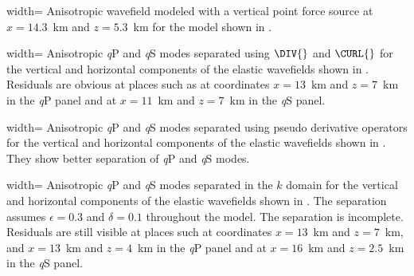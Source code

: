 
{width=\textwidth} {Anisotropic wavefield modeled with a vertical
point force source at $x=14.3$~km and $z=5.3$~km for the model shown in
{}.}


{width=\textwidth} {Anisotropic {\it q}P and {\it q}S modes
separated using $\DIV{}$ and $\CURL{}$ for the vertical and horizontal
components of the elastic wavefields shown in
{}.  Residuals are obvious at places such as
at coordinates $x=13$~km and $z=7$~km in the {\it q}P panel and at
$x=11$~km and $z=7$~km in the {\it q}S panel.  }

{width=\textwidth} {Anisotropic {\it q}P and {\it q}S modes
separated using pseudo derivative operators for the vertical and
horizontal components of the elastic wavefields shown in
{}.  They show {better}
separation of {\it q}P and {\it q}S modes. }

{width=\textwidth} {Anisotropic {\it q}P and {\it q}S modes
separated in the $k$ domain for the vertical and horizontal components
of the elastic wavefields shown in {}. The
separation assumes $\epsilon=0.3$ and $\delta=0.1$ throughout the
model. The separation is incomplete. Residuals are still visible at
places such at coordinates $x=13$~km and $z=7$~km, and $x=13$~km
and $z=4$~km in the {\it q}P panel and at $x=16$~km and $z=2.5$~km in
the {\it q}S panel. }

